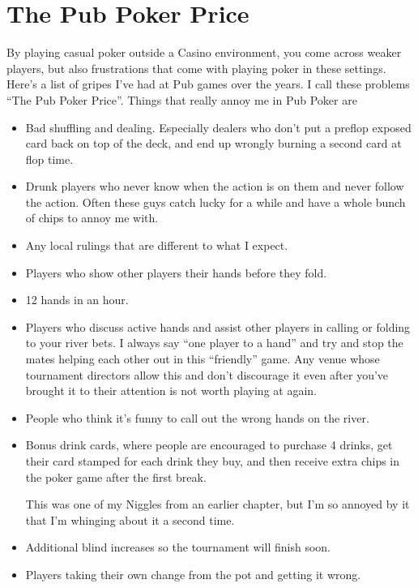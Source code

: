 \chapter{The Pub Poker Price}


By playing casual poker outside a Casino environment, you come across
weaker players, but also frustrations that come with playing
poker in these settings. Here's a list of gripes I've had at Pub
games over the years. I call these problems ``The Pub Poker Price''.
Things that really annoy me in Pub Poker are

\begin{itemize}

\item Bad shuffling and dealing. Especially dealers who don't
put a preflop exposed card back on top of the deck, and end
up wrongly burning a second card at flop time.

\item Drunk players who never know when the action is on them and
never follow the action. Often these guys catch lucky for a while
and have a whole bunch of chips to annoy me with.

\item Any local rulings that are different to what I expect.

\item Players who show other players their hands before they fold.

\item 12 hands in an hour.

\item Players who discuss active hands and assist other players in
calling or folding to your river bets. I always say ``one
player to a hand'' and try and stop the mates helping each other
out in this ``friendly'' game. Any venue whose tournament directors
allow this and don't discourage it even after you've brought
it to their attention is not worth playing at again.

\item People who think it's funny to call out the wrong hands on the river.

\item Bonus drink cards, where people are encouraged to purchase 4 drinks,
get their card stamped for each drink they buy, and then receive extra
chips in the poker game after the first break.

This was one of my Niggles from an earlier chapter, but I'm so annoyed
by it that I'm whinging about it a second time.

\item Additional blind increases so the tournament will finish soon.

\item Players taking their own change from the pot and getting it wrong.

\end{itemize}

